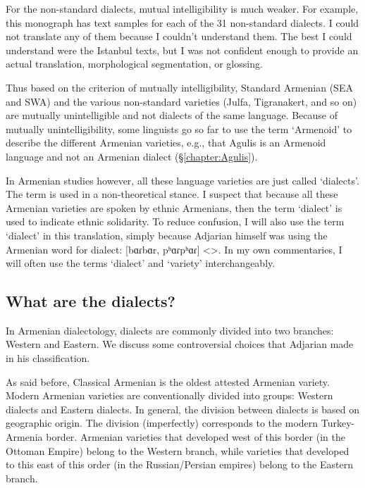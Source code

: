 For the non-standard dialects, mutual intelligibility is much weaker. For example, this monograph has text samples for each of the 31 non-standard dialects. I could not translate any of them because I couldn't understand them. The best I could understand were the Istanbul texts, but I was not confident enough to provide an actual translation, morphological segmentation, or glossing. 


Thus based on the criterion of mutually intelligibility, Standard Armenian (SEA and SWA) and the various non-standard varieties (Julfa, Tigranakert, and so on) are mutually unintelligible and not dialects of the same language. Because of mutually unintelligibility, some linguists go so far to use the term `Armenoid' to describe the different Armenian varieties, e.g., that Agulis is an Armenoid language \citep{Vaux-2008-ArmenianZok} and not an Armenian dialect (\S\ref{chapter:Agulis}). 

In Armenian studies however, all these language varieties are just called `dialects'. The term is used in a non-theoretical stance. I suspect that because all these Armenian varieties are spoken by ethnic Armenians, then the term `dialect' is used to indicate ethnic solidarity. To reduce confusion, I will also use the term `dialect' in this translation, simply because Adjarian himself was using the Armenian word for dialect: [bɑɾbɑr, pʰɑɾpʰɑɾ] <>. In my own commentaries, I will often use the terms `dialect' and `variety' interchangeably. 





\subsection{What are the dialects?}\label{sec:HossepIntro:armenian:whataredialect}

In Armenian dialectology, dialects are commonly divided into two branches: Western and Eastern. We discuss some controversial choices that Adjarian made in his classification. 


As said before, Classical Armenian is the oldest attested Armenian variety. Modern Armenian varieties are conventionally divided into groups: Western dialects and Eastern dialects. In general, the division between dialects is based on geographic origin. The division (imperfectly) corresponds to the modern Turkey-Armenia border. Armenian varieties that developed west of this border (in the Ottoman Empire) belong to the Western branch, while varieties that developed to this east of this order (in the Russian/Persian empires) belong to the Eastern branch. 

